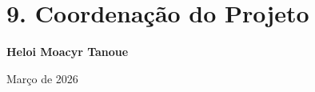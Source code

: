 \documentclass[12pt,a4paper]{article}
\begin{document}

\section*{9. Coordenação do Projeto}

\begin{center}
\textbf{Heloi Moacyr Tanoue}
\end{center}


\vfill
\begin{center}
    Março de 2026
\end{center}
\end{document}
